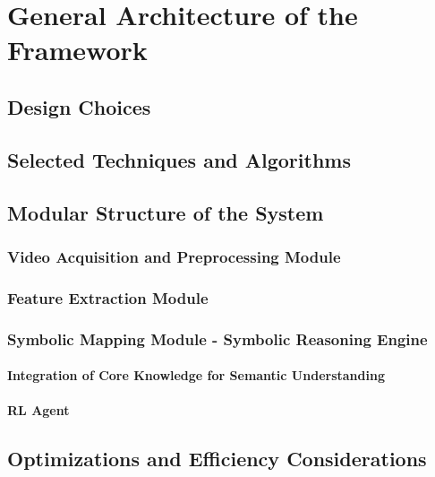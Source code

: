 \documentclass[12pt,a4paper]{report}
\begin{document}
\section{General Architecture of the Framework}

\subsection{Design Choices}

\subsection{Selected Techniques and Algorithms}

\subsection{Modular Structure of the System}

\subsubsection{Video Acquisition and Preprocessing Module}

\subsubsection{Feature Extraction Module}

\subsubsection{Symbolic Mapping Module - Symbolic Reasoning Engine}

\paragraph{Integration of Core Knowledge for Semantic Understanding}

\paragraph{RL Agent}

\subsection{Optimizations and Efficiency Considerations}

\end{document}
